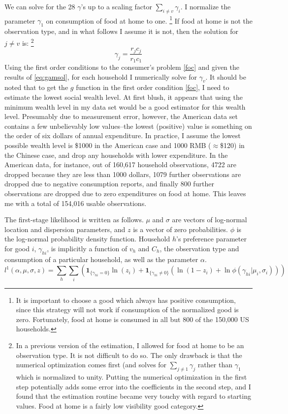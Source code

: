 \documentclass[12pt]{article}
\begin{document}
We can solve for the 28 $\gamma$'s up to a scaling factor $\sum_{i\neq v}\gamma_i$.
I normalize the parameter $\gamma_1$ on consumption of food at home to one. 
\footnote{It is important to choose a good which always has positive consumption, since this strategy will not work if consumption of the normalized good is zero.  
Fortunately, food at home is consumed in all but 800 of the 150,000 US households.}
If food at home is not the observation type, and in what follows I assume it is not, then the solution for $j \neq v$ is:
\footnote{In a previous version of the estimation, I allowed for food at home to be an observation type.
It is not difficult to do so.
The only drawback is that the numerical optimization comes first (and solves for $\sum_{j \neq 1} \gamma_j$ rather than $\gamma_1$ which is normalized to unity.  
Putting the numerical optimization in the first step potentially adds some error into the coefficients in the second step, and I found that the estimation routine became very touchy with regard to starting values.  Food at home is a fairly low visibility good category.
}
\begin{equation}
	\label{eq:gamsol}
	\gamma_j = \frac{r_j c_j}{r_1 c_1}
\end{equation}
Using the first order conditions to the consumer's problem \eqref{foc} and given the results of \eqref{eq:gamsol}, for each household I numerically solve for  $\gamma_v$.
It should be noted that to get the $g$ function in the first order condition \eqref{foc}, I need to estimate the lowest social wealth level. 
At first blush, it appears that using the minimum wealth level in my data set would be a good estimator for this wealth level.
Presumably due to measurement error, however, the American data set contains a few unbelievably low values--the lowest (positive) value is something on the order of six dollars of annual expenditure.
In practice, I assume the lowest possible wealth level is \$1000 in the American case and 1000 RMB ($\approx$\$120) in the Chinese case, and drop any households with lower expenditure.
In the American data, for instance, out of 160,617 household observations, 4722 are dropped because they are less than 1000 dollars, 1079 further observations are dropped due to negative consumption reports, and finally 800 further observations are dropped due to zero expenditures on food at home.
This leaves me with a total of 154,016 usable observations.

The first-stage likelihood is written as follows. $\mu$ and $\sigma$ are vectors of log-normal location and dispersion parameters, and $z$ is a vector of zero probabilities. $\phi$ is the log-normal probability density function. Household $h$'s preference parameter for good $i$, $\gamma_{hi}$, is implicitly a function of $v_h$ and $C_{h}$, the observation type and consumption of a particular household, as well as the parameter $\alpha$. 
\begin{equation}
	\label{lik1}
	l^1(\alpha,\mu,\sigma,z) = \sum_{h} \sum_{i} \left(\mathbf{1}_{\{\gamma_{hi} = 0\}}\ln\left(z_i\right) + \mathbf{1}_{\{\gamma_{hi} \neq 0\}} \left(\ln\left(1 - z_i\right)+\ln \phi(\gamma_{hi}|\mu_i,\sigma_i)\right)\right)
\end{equation}
\end{document}
